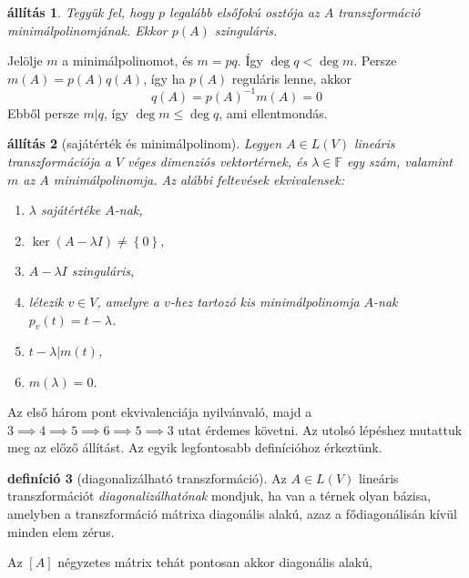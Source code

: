 \documentclass[9pt, a4paper, showtrims]{memoir}
\makeatletter
\renewenvironment{proof}[1][\proofname]
    {\par\pushQED{\qed}%
    \normalfont \topsep6\p@\@plus6\p@\relax
    \trivlist
    \item[\hskip\labelsep
        \itshape
    #1\@addpunct{:}]\ignorespaces}
    {\popQED\endtrivlist\@endpefalse}
\theoremstyle{plain}
\newtheorem{proposition}{állítás}[chapter]
\theoremstyle{remark}
\theoremstyle{definition}
\newtheorem{definition}[proposition]{definíció}
\makeatother
\begin{document}
\begin{proposition}
	Tegyük fel, hogy $p$ legalább elsőfokú osztója az $A$ transzformáció minimálpolinomjának.
	Ekkor $p\left( A \right)$ szinguláris.
\end{proposition}
\begin{proof}
	Jelölje $m$ a minimálpolinomot,
	és $m=pq$.
	Így $\deg q<\deg m$. Persze $m\left( A \right)=p\left( A \right)q\left( A \right)$,
	így ha $p\left( A \right)$ reguláris lenne,
	akkor
	\[
		q\left( A \right)=p\left( A \right)^{-1}m\left( A \right)=0
	\]
	Ebből persze $m|q$, így $\deg m\leq \deg q$, ami ellentmondás.
\end{proof}
\begin{proposition}[sajátérték és minimálpolinom]
	Legyen $A\in L\left( V \right)$ lineáris transzformációja a $V$ véges dimenziós
	vektortérnek, és $\lambda\in\mathbb{F}$ egy szám, valamint $m$ az $A$ minimálpolinomja.
	Az alábbi feltevések ekvivalensek:
	\begin{enumerate}
		\item $\lambda$ sajátértéke $A$-nak,
		\item $\ker (A-\lambda I)\neq \left\{ 0 \right\}$,
		\item $A-\lambda I$ szinguláris,
		\item létezik $v\in V$,
		      amelyre a $v$-hez tartozó kis minimálpolinomja $A$-nak $p_v(t)=t-\lambda$.
		\item $t-\lambda|m\left( t \right)$,
		\item $m\left( \lambda \right)=0.$\qedhere
	\end{enumerate}
\end{proposition}
\begin{proof}
	Az első három pont ekvivalenciája nyilvánvaló,
	majd a $3\implies 4\implies 5\implies 6\implies 5\implies 3$
	utat érdemes követni.
	Az utolsó lépéshez mutattuk meg az előző állítást.
\end{proof}
Az egyik legfontosabb definícióhoz érkeztünk.
\begin{definition}[diagonalizálható transzformáció]
	Az $A\in L\left( V \right)$ lineáris transzformációt \emph{diagonalizálhatónak}
	mondjuk,
	ha van a térnek olyan bázisa,
	amelyben a transzformáció mátrixa diagonális alakú,
	azaz a fődiagonálisán kívül minden elem zérus.
\end{definition}
Az $\left[ A \right]$ négyzetes mátrix tehát pontosan akkor diagonális alakú,
\end{document}

